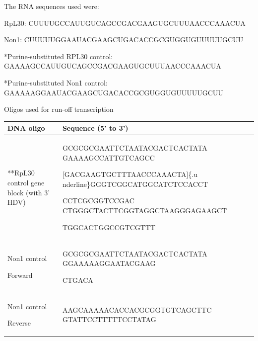 \documentclass[12pt,twoside]{reedthesis}
\begin{document}
The RNA sequences used were:

RpL30: {CUUUU}GCCAUUGUCAGCCGACGAAGUGCUUUAACCCAAACUA

Non1: {CUUUUU}GGAAUACGAAGCUGACACCGCGUGGUGUUUUUGCUU

*Purine-substituted RPL30 control:
{GAAAAG}CCAUUGUCAGCCGACGAAGUGCUUUAACCCAAACUA

*Purine-substituted Non1 control:
{GAAAAAG}GAAUACGAAGCUGACACCGCGUGGUGUUUUUGCUU

Oligos used for run-off transcription
\begin{longtable}[]{@{}ll@{}}
\toprule
\begin{minipage}[b]{0.46\columnwidth}\raggedright
\textbf{DNA oligo}\strut
\end{minipage} & \begin{minipage}[b]{0.46\columnwidth}\raggedright
\textbf{Sequence (5' to 3')}\strut
\end{minipage}\tabularnewline
\midrule
\endhead
\begin{minipage}[t]{0.46\columnwidth}\raggedright
**RpL30 control gene block
(with 3' HDV)\strut
\end{minipage} & \begin{minipage}[t]{0.46\columnwidth}\raggedright
GCGCGCGAATTCTAATACGACTCACTATA
\textbar{} {GAAAAGCCATTGTCAGCC}

{[}GACGAAGTGCTTTAACCCAAACTA{]}\{.u
nderline\}GGGTCGGCATGGCATCTCCACCT

CCTCGCGGTCCGAC
CTGGGCTACTTCGGTAGGCTAAGGGAGAAGCT

TGGCACTGGCCGTCGTTT\strut
\end{minipage}\tabularnewline
\begin{minipage}[t]{0.46\columnwidth}\raggedright
Non1 control

Forward\strut
\end{minipage} & \begin{minipage}[t]{0.46\columnwidth}\raggedright
GCGCGCGAATTCTAATACGACTCACTATA
{GGAAAAAGGAATACGAAG}

{CTGACA}\strut
\end{minipage}\tabularnewline
\begin{minipage}[t]{0.46\columnwidth}\raggedright
Non1 control

Reverse\strut
\end{minipage} & \begin{minipage}[t]{0.46\columnwidth}\raggedright
{AAGCAAAAACACCACGCGGTGTCAGCTTC
GTATTCCTTTTTC}CTATAG


\end{minipage}
\end{longtable}
\end{document}
